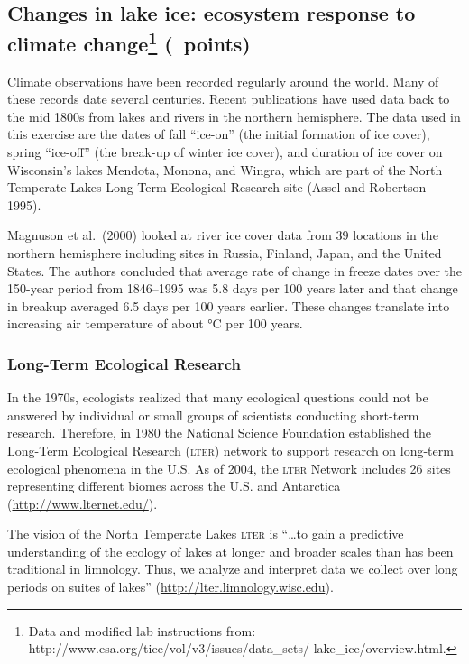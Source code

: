 \documentclass[12pt, hidelinks, addpoints]{exam}
\newcommand{\hidepoints}{%
	\pointsinmargin\pointformat{}
}
\begin{document}
\hidepoints

\subsection*{Changes in lake ice: ecosystem response to climate
change\footnote{\raggedright Data and modified lab instructions from: http://www.esa.org/tiee/vol/v3/issues/data\_sets/ lake\_ice/overview.html.} (\numpoints\ points)}

Climate observations have been recorded regularly around the world. Many of
these records date several centuries. Recent
publications have used data back to the mid 1800s from lakes and rivers in the northern
hemisphere. The data used in this exercise
are the dates of fall ``ice-on'' (the initial formation of ice cover),
spring ``ice-off'' (the break-up of winter ice cover), and duration of ice
cover on Wisconsin's lakes Mendota, Monona, and Wingra, which are part
of the North Temperate Lakes Long-Term Ecological Research site (Assel
and Robertson 1995).

Magnuson et al.~(2000) looked at river ice cover data from 39 locations
in the northern hemisphere including sites in Russia, Finland, Japan,
and the United States. The authors concluded that average rate of change 
in freeze dates over the 150-year period from 1846–1995 was 5.8 days per 100
years later and that change in breakup averaged 6.5 days per 100 years
earlier. These changes translate into increasing air temperature of
about {}°C per 100 years.

\subsubsection*{Long-Term Ecological Research}

In the 1970s, ecologists realized that many ecological questions could
not be answered by individual or small groups of scientists conducting
short-term research. Therefore, in 1980 the National Science Foundation
established the Long-Term Ecological Research (\textsc{lter}) network to support
research on long-term ecological phenomena in the U.S. As of 2004, the
\textsc{lter} Network includes 26 sites representing different biomes across the
U.S. and Antarctica (\url{http://www.lternet.edu/}).

The vision of the North Temperate Lakes \textsc{lter} is ``\dots to gain a
predictive understanding of the ecology of lakes at longer and broader
scales than has been traditional in limnology. Thus, we analyze and
interpret data we collect over long periods on suites of lakes''
(\url{http://lter.limnology.wisc.edu}).
\end{document}
